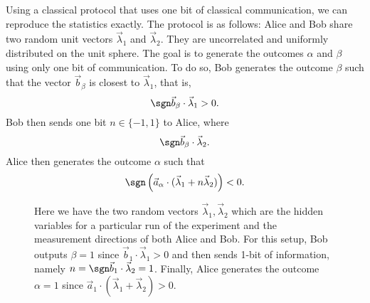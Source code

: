 \documentclass[a4paper]{article}
\begin{document}
    Using a classical protocol that uses one bit of
    classical communication, we can reproduce the statistics
    exactly. The protocol is as follows: Alice and Bob share
    two random unit vectors $\vec \lambda_1$ and $\vec
    \lambda_2$. They are uncorrelated and uniformly
    distributed on the unit sphere. The goal is to generate
    the outcomes $\alpha$ and $\beta$ using only one bit of
    communication. To do so, Bob generates the outcome
    $\beta$ such that the vector $\vec b_\beta$ is closest
    to  $\vec \lambda_1$, that is,
    \begin{equation}
        \sgn \vec b_\beta \cdot \vec \lambda_1
        > 0.
    \end{equation}
    Bob then sends one bit $n \in \{-1,1\}$ to Alice, where
    \begin{equation}
        \sgn \vec b_\beta \cdot \vec \lambda_2.
    \end{equation}
    Alice then generates the outcome $\alpha$ such that
    \begin{equation}
        \sgn\left( \vec a_\alpha \cdot (\vec \lambda_1 + n
        \vec \lambda_2) \right) < 0.
    \end{equation}

    \begin{figure}[ht]
        \centering





        \caption{
            Here we have the two random vectors $\vec
            \lambda_1, \vec \lambda_2$ which are the hidden
            variables for a particular run of the experiment
            and the measurement directions of both
            {\color{blue} Alice} and {\color{red} Bob}.  For
            this setup, Bob outputs $\beta = 1$ since $\vec
            b_1 \cdot \vec \lambda_1 > 0$ and then sends
            1-bit of information, namely $n = \sgn \vec b_1
            \cdot \vec \lambda_2 = 1$. Finally, Alice
            generates the outcome $\alpha = 1$ since $\vec
            a_1 \cdot (\vec \lambda_1 + \vec \lambda_2) >
            0$.
        }
        \label{fig:toner-bacon-example}
    \end{figure}
\end{document}
